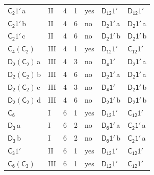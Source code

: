 \documentclass[10pt,a4paper]{article}
\numberwithin{equation}{section}
\newcommand{\grp}[1]{\mathsf{#1}}
\newcommand{\clsletter}[1]{\,{\scriptsize\color{black!55}#1}}
\begin{document}
{\begin{longtable}{@{}llrrlll@{}}
\href{C2-1p.pdf}{$\grp{C_{2}1'}$}\clsletter{a} & II & 4 & 1 & yes & \href{D12-1p.pdf}{$\grp{D_{12}1'}$} & \href{D12-1p.pdf}{$\grp{D_{12}1'}$}\\
\href{C2-1p.pdf}{$\grp{C_{2}1'}$}\clsletter{b} & II & 4 & 6 & no & \href{D2-1p.pdf}{$\grp{D_{2}1'}$}\clsletter{a} & \href{D2-1p.pdf}{$\grp{D_{2}1'}$}\clsletter{a}\\
\href{C2-1p.pdf}{$\grp{C_{2}1'}$}\clsletter{c} & II & 4 & 6 & no & \href{D2-1p.pdf}{$\grp{D_{2}1'}$}\clsletter{b} & \href{D2-1p.pdf}{$\grp{D_{2}1'}$}\clsletter{b}\\
\href{C4-C2.pdf}{$\grp{C_{4}}(\grp{C_{2}})$} & III & 4 & 1 & yes & \href{D12-1p.pdf}{$\grp{D_{12}1'}$} & \href{C12-1p.pdf}{$\grp{C_{12}1'}$}\\
\href{D2-C2.pdf}{$\grp{D_{2}}(\grp{C_{2}})$}\clsletter{a} & III & 4 & 3 & no & \href{D4-1p.pdf}{$\grp{D_{4}1'}$} & \href{D2-1p.pdf}{$\grp{D_{2}1'}$}\clsletter{a}\\
\href{D2-C2.pdf}{$\grp{D_{2}}(\grp{C_{2}})$}\clsletter{b} & III & 4 & 6 & no & \href{D2-1p.pdf}{$\grp{D_{2}1'}$}\clsletter{a} & \href{D2-1p.pdf}{$\grp{D_{2}1'}$}\clsletter{a}\\
\href{D2-C2.pdf}{$\grp{D_{2}}(\grp{C_{2}})$}\clsletter{c} & III & 4 & 3 & no & \href{D4-1p.pdf}{$\grp{D_{4}1'}$} & \href{D2-1p.pdf}{$\grp{D_{2}1'}$}\clsletter{b}\\
\href{D2-C2.pdf}{$\grp{D_{2}}(\grp{C_{2}})$}\clsletter{d} & III & 4 & 6 & no & \href{D2-1p.pdf}{$\grp{D_{2}1'}$}\clsletter{b} & \href{D2-1p.pdf}{$\grp{D_{2}1'}$}\clsletter{b}\\
\href{../../../rotation/data/pdf/C6.pdf}{$\grp{C_{6}}$} & I & 6 & 1 & yes & \href{D12-1p.pdf}{$\grp{D_{12}1'}$} & \href{C12-1p.pdf}{$\grp{C_{12}1'}$}\\
\href{../../../rotation/data/pdf/D3.pdf}{$\grp{D_{3}}$}\clsletter{a} & I & 6 & 2 & no & \href{D6-1p.pdf}{$\grp{D_{6}1'}$}\clsletter{a} & \href{C2-1p.pdf}{$\grp{C_{2}1'}$}\clsletter{a}\\
\href{../../../rotation/data/pdf/D3.pdf}{$\grp{D_{3}}$}\clsletter{b} & I & 6 & 2 & no & \href{D6-1p.pdf}{$\grp{D_{6}1'}$}\clsletter{b} & \href{C2-1p.pdf}{$\grp{C_{2}1'}$}\clsletter{a}\\
\href{C3-1p.pdf}{$\grp{C_{3}1'}$} & II & 6 & 1 & yes & \href{D12-1p.pdf}{$\grp{D_{12}1'}$} & \href{C12-1p.pdf}{$\grp{C_{12}1'}$}\\
\href{C6-C3.pdf}{$\grp{C_{6}}(\grp{C_{3}})$} & III & 6 & 1 & yes & \href{D12-1p.pdf}{$\grp{D_{12}1'}$} & \href{C12-1p.pdf}{$\grp{C_{12}1'}$}\\

\end{longtable}}
\end{document}

